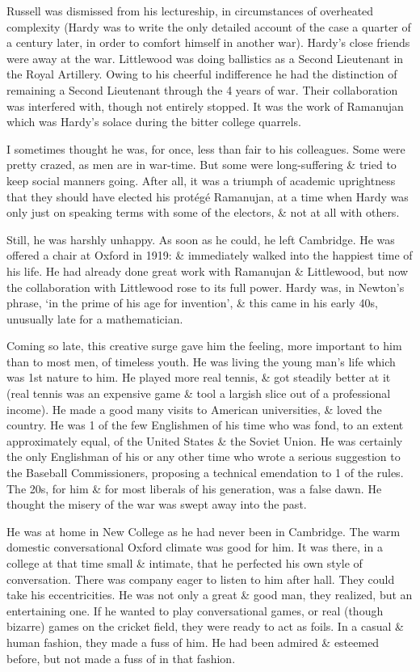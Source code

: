 \documentclass{article}
\numberwithin{equation}{section}
\begin{document}
Russell was dismissed from his lectureship, in circumstances of overheated complexity (Hardy was to write the only detailed account of the case a quarter of a century later, in order to comfort himself in another war). Hardy's close friends were away at the war. Littlewood was doing ballistics as a Second Lieutenant in the Royal Artillery. Owing to his cheerful indifference he had the distinction of remaining a Second Lieutenant through the 4 years of war. Their collaboration was interfered with, though not entirely stopped. It was the work of Ramanujan which was Hardy's solace during the bitter college quarrels.

I sometimes thought he was, for once, less than fair to his colleagues. Some were pretty crazed, as men are in war-time. But some were long-suffering \& tried to keep social manners going. After all, it was a triumph of academic uprightness that they should have elected his prot\'eg\'e Ramanujan, at a time when Hardy was only just on speaking terms with some of the electors, \& not at all with others.

Still, he was harshly unhappy. As soon as he could, he left Cambridge. He was offered a chair at Oxford in 1919: \& immediately walked into the happiest time of his life. He had already done great work with Ramanujan \& Littlewood, but now the collaboration with Littlewood rose to its full power. Hardy was, in Newton's phrase, `in the prime of his age for invention', \& this came in his early 40s, unusually late for a mathematician.

Coming so late, this creative surge gave him the feeling, more important to him than to most men, of timeless youth. He was living the young man's life which was 1st nature to him. He played more real tennis, \& got steadily better at it (real tennis was an expensive game \& tool a largish slice out of a professional income). He made a good many visits to American universities, \& loved the country. He was 1 of the few Englishmen of his time who was fond, to an extent approximately equal, of the United States \& the Soviet Union. He was certainly the only Englishman of his or any other time who wrote a serious suggestion to the Baseball Commissioners, proposing a technical emendation to 1 of the rules. The 20s, for him \& for most liberals of his generation, was a false dawn. He thought the misery of the war was swept away into the past.

He was at home in New College as he had never been in Cambridge. The warm domestic conversational Oxford climate was good for him. It was there, in a college at that time small \& intimate, that he perfected his own style of conversation. There was company eager to listen to him after hall. They could take his eccentricities. He was not only a great \& good man, they realized, but an entertaining one. If he wanted to play conversational games, or real (though bizarre) games on the cricket field, they were ready to act as foils. In a casual \& human fashion, they made a fuss of him. He had been admired \& esteemed before, but not made a fuss of in that fashion.
\end{document}

